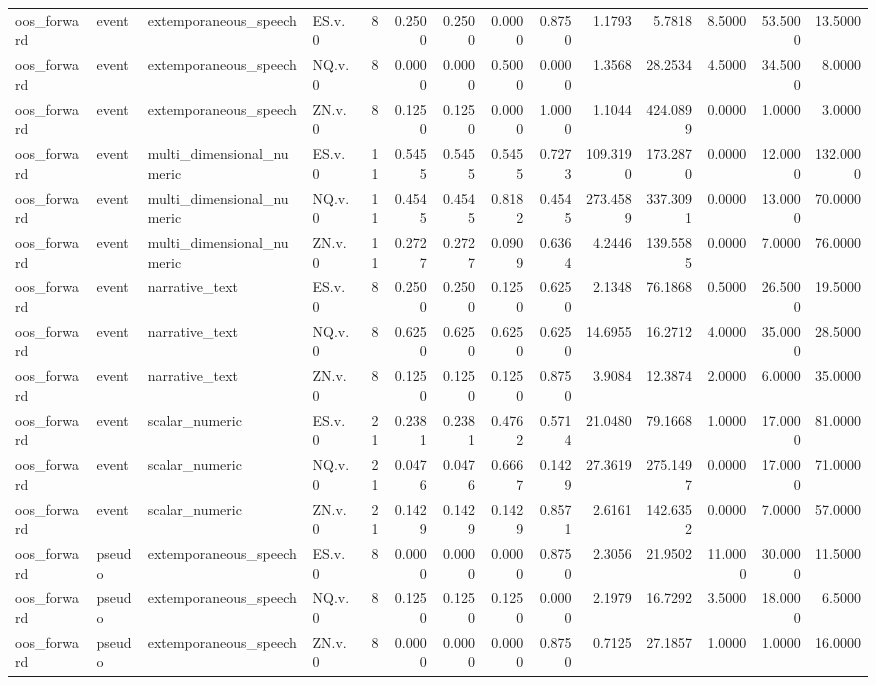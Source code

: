 \begin{tabular}{llllrrrrrrrrrr}
oos_forward & event & extemporaneous_speech & ES.v.0 & 8 & 0.2500 & 0.2500 & 0.0000 & 0.8750 & 1.1793 & 5.7818 & 8.5000 & 53.5000 & 13.5000 \\
oos_forward & event & extemporaneous_speech & NQ.v.0 & 8 & 0.0000 & 0.0000 & 0.5000 & 0.0000 & 1.3568 & 28.2534 & 4.5000 & 34.5000 & 8.0000 \\
oos_forward & event & extemporaneous_speech & ZN.v.0 & 8 & 0.1250 & 0.1250 & 0.0000 & 1.0000 & 1.1044 & 424.0899 & 0.0000 & 1.0000 & 3.0000 \\
oos_forward & event & multi_dimensional_numeric & ES.v.0 & 11 & 0.5455 & 0.5455 & 0.5455 & 0.7273 & 109.3190 & 173.2870 & 0.0000 & 12.0000 & 132.0000 \\
oos_forward & event & multi_dimensional_numeric & NQ.v.0 & 11 & 0.4545 & 0.4545 & 0.8182 & 0.4545 & 273.4589 & 337.3091 & 0.0000 & 13.0000 & 70.0000 \\
oos_forward & event & multi_dimensional_numeric & ZN.v.0 & 11 & 0.2727 & 0.2727 & 0.0909 & 0.6364 & 4.2446 & 139.5585 & 0.0000 & 7.0000 & 76.0000 \\
oos_forward & event & narrative_text & ES.v.0 & 8 & 0.2500 & 0.2500 & 0.1250 & 0.6250 & 2.1348 & 76.1868 & 0.5000 & 26.5000 & 19.5000 \\
oos_forward & event & narrative_text & NQ.v.0 & 8 & 0.6250 & 0.6250 & 0.6250 & 0.6250 & 14.6955 & 16.2712 & 4.0000 & 35.0000 & 28.5000 \\
oos_forward & event & narrative_text & ZN.v.0 & 8 & 0.1250 & 0.1250 & 0.1250 & 0.8750 & 3.9084 & 12.3874 & 2.0000 & 6.0000 & 35.0000 \\
oos_forward & event & scalar_numeric & ES.v.0 & 21 & 0.2381 & 0.2381 & 0.4762 & 0.5714 & 21.0480 & 79.1668 & 1.0000 & 17.0000 & 81.0000 \\
oos_forward & event & scalar_numeric & NQ.v.0 & 21 & 0.0476 & 0.0476 & 0.6667 & 0.1429 & 27.3619 & 275.1497 & 0.0000 & 17.0000 & 71.0000 \\
oos_forward & event & scalar_numeric & ZN.v.0 & 21 & 0.1429 & 0.1429 & 0.1429 & 0.8571 & 2.6161 & 142.6352 & 0.0000 & 7.0000 & 57.0000 \\
oos_forward & pseudo & extemporaneous_speech & ES.v.0 & 8 & 0.0000 & 0.0000 & 0.0000 & 0.8750 & 2.3056 & 21.9502 & 11.0000 & 30.0000 & 11.5000 \\
oos_forward & pseudo & extemporaneous_speech & NQ.v.0 & 8 & 0.1250 & 0.1250 & 0.1250 & 0.0000 & 2.1979 & 16.7292 & 3.5000 & 18.0000 & 6.5000 \\
oos_forward & pseudo & extemporaneous_speech & ZN.v.0 & 8 & 0.0000 & 0.0000 & 0.0000 & 0.8750 & 0.7125 & 27.1857 & 1.0000 & 1.0000 & 16.0000 \\

\end{tabular}
